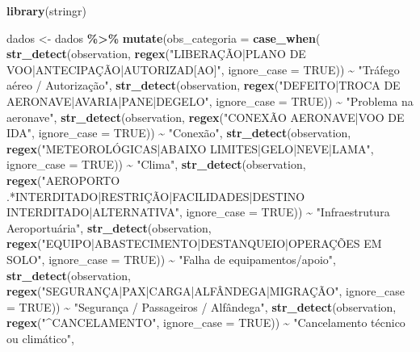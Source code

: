 \documentclass[
]{article}
\newenvironment{Shaded}{\begin{snugshade}}{\end{snugshade}}
\newcommand{\AttributeTok}[1]{\textcolor[rgb]{0.13,0.29,0.53}{#1}}
\newcommand{\ConstantTok}[1]{\textcolor[rgb]{0.56,0.35,0.01}{#1}}
\newcommand{\FunctionTok}[1]{\textcolor[rgb]{0.13,0.29,0.53}{\textbf{#1}}}
\newcommand{\NormalTok}[1]{#1}
\newcommand{\OtherTok}[1]{\textcolor[rgb]{0.56,0.35,0.01}{#1}}
\newcommand{\SpecialCharTok}[1]{\textcolor[rgb]{0.81,0.36,0.00}{\textbf{#1}}}
\newcommand{\StringTok}[1]{\textcolor[rgb]{0.31,0.60,0.02}{#1}}
\begin{document}
\begin{Shaded}
\begin{Highlighting}[]
\FunctionTok{library}\NormalTok{(stringr)}

\NormalTok{dados }\OtherTok{\textless{}{-}}\NormalTok{ dados }\SpecialCharTok{\%\textgreater{}\%}
  \FunctionTok{mutate}\NormalTok{(}\AttributeTok{obs\_categoria =} \FunctionTok{case\_when}\NormalTok{(}
    \FunctionTok{str\_detect}\NormalTok{(observation, }\FunctionTok{regex}\NormalTok{(}\StringTok{"LIBERAÇÃO|PLANO DE VOO|ANTECIPAÇÃO|AUTORIZAD[AO]"}\NormalTok{, }\AttributeTok{ignore\_case =} \ConstantTok{TRUE}\NormalTok{)) }\SpecialCharTok{\textasciitilde{}} \StringTok{"Tráfego aéreo / Autorização"}\NormalTok{,}
    \FunctionTok{str\_detect}\NormalTok{(observation, }\FunctionTok{regex}\NormalTok{(}\StringTok{"DEFEITO|TROCA DE AERONAVE|AVARIA|PANE|DEGELO"}\NormalTok{, }\AttributeTok{ignore\_case =} \ConstantTok{TRUE}\NormalTok{)) }\SpecialCharTok{\textasciitilde{}} \StringTok{"Problema na aeronave"}\NormalTok{,}
    \FunctionTok{str\_detect}\NormalTok{(observation, }\FunctionTok{regex}\NormalTok{(}\StringTok{"CONEXÃO AERONAVE|VOO DE IDA"}\NormalTok{, }\AttributeTok{ignore\_case =} \ConstantTok{TRUE}\NormalTok{)) }\SpecialCharTok{\textasciitilde{}} \StringTok{"Conexão"}\NormalTok{,}
    \FunctionTok{str\_detect}\NormalTok{(observation, }\FunctionTok{regex}\NormalTok{(}\StringTok{"METEOROLÓGICAS|ABAIXO LIMITES|GELO|NEVE|LAMA"}\NormalTok{, }\AttributeTok{ignore\_case =} \ConstantTok{TRUE}\NormalTok{)) }\SpecialCharTok{\textasciitilde{}} \StringTok{"Clima"}\NormalTok{,}
    \FunctionTok{str\_detect}\NormalTok{(observation, }\FunctionTok{regex}\NormalTok{(}\StringTok{"AEROPORTO .*INTERDITADO|RESTRIÇÃO|FACILIDADES|DESTINO INTERDITADO|ALTERNATIVA"}\NormalTok{, }\AttributeTok{ignore\_case =} \ConstantTok{TRUE}\NormalTok{)) }\SpecialCharTok{\textasciitilde{}} \StringTok{"Infraestrutura Aeroportuária"}\NormalTok{,}
    \FunctionTok{str\_detect}\NormalTok{(observation, }\FunctionTok{regex}\NormalTok{(}\StringTok{"EQUIPO|ABASTECIMENTO|DESTANQUEIO|OPERAÇÕES EM SOLO"}\NormalTok{, }\AttributeTok{ignore\_case =} \ConstantTok{TRUE}\NormalTok{)) }\SpecialCharTok{\textasciitilde{}} \StringTok{"Falha de equipamentos/apoio"}\NormalTok{,}
    \FunctionTok{str\_detect}\NormalTok{(observation, }\FunctionTok{regex}\NormalTok{(}\StringTok{"SEGURANÇA|PAX|CARGA|ALFÂNDEGA|MIGRAÇÃO"}\NormalTok{, }\AttributeTok{ignore\_case =} \ConstantTok{TRUE}\NormalTok{)) }\SpecialCharTok{\textasciitilde{}} \StringTok{"Segurança / Passageiros / Alfândega"}\NormalTok{,}
    \FunctionTok{str\_detect}\NormalTok{(observation, }\FunctionTok{regex}\NormalTok{(}\StringTok{"\^{}CANCELAMENTO"}\NormalTok{, }\AttributeTok{ignore\_case =} \ConstantTok{TRUE}\NormalTok{)) }\SpecialCharTok{\textasciitilde{}} \StringTok{"Cancelamento técnico ou climático"}\NormalTok{,}

\end{Highlighting}
\end{Shaded}
\end{document}
